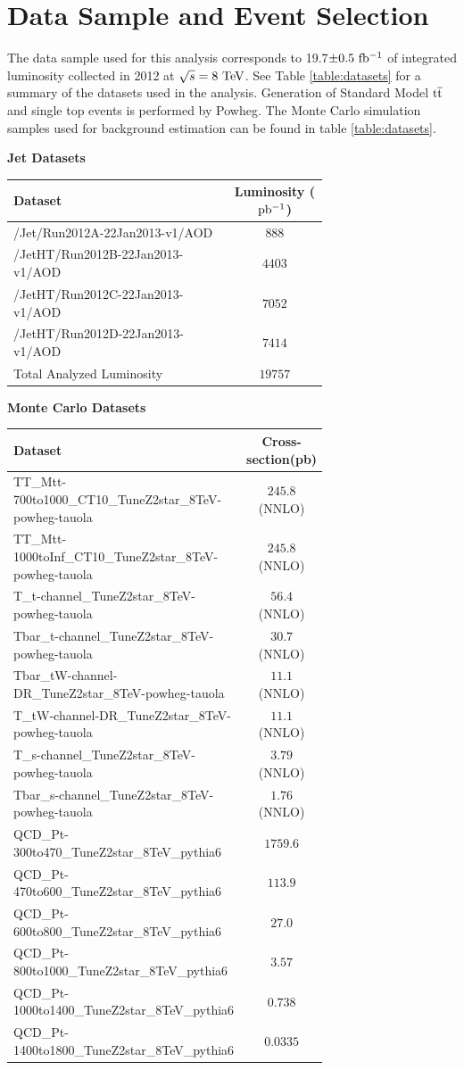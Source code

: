 \chapter{Data Sample and Event Selection}
\label{sec:datasampleAndSelection}
The data sample used for this analysis corresponds to 19.7$\pm0.5~\mathrm{fb^{-1}}$ of integrated 
luminosity collected in 2012 at $\sqrt{s} = 8~\mathrm{TeV}$.  See Table \ref{table:datasets} for a summary of the datasets used in the analysis.
Generation of Standard Model $\mathrm{t\overline{t}}$ and single top events is performed by Powheg.  The Monte Carlo simulation samples used for background estimation can be found in table \ref{table:datasets}.

\begin{table}
\begin{center}
\bf{Jet Datasets}
\begin{tabular}{|p{0.7\linewidth}|c|}
\hline
\bf{Dataset} & \bf{Luminosity ($\mathrm{pb^{-1}}$)} \\
\hline
/Jet/Run2012A-22Jan2013-v1/AOD & $888$ \\
/JetHT/Run2012B-22Jan2013-v1/AOD & $4403$ \\
/JetHT/Run2012C-22Jan2013-v1/AOD & $7052$ \\
/JetHT/Run2012D-22Jan2013-v1/AOD & $7414$ \\
\hline
Total Analyzed Luminosity & $19757$ \\
\hline
\end{tabular}
\bf{Monte Carlo Datasets} \\
\begin{tabular}{|p{0.7\linewidth}|c|}
\hline
\bf{Dataset} & \bf{Cross-section(pb)} \\
\hline
TT\_Mtt-700to1000\_CT10\_TuneZ2star\_8TeV-powheg-tauola & $245.8$ (NNLO)\\
TT\_Mtt-1000toInf\_CT10\_TuneZ2star\_8TeV-powheg-tauola & $245.8$ (NNLO)\\
T\_t-channel\_TuneZ2star\_8TeV-powheg-tauola & $56.4$ (NNLO)\\
Tbar\_t-channel\_TuneZ2star\_8TeV-powheg-tauola & $30.7$ (NNLO)\\
Tbar\_tW-channel-DR\_TuneZ2star\_8TeV-powheg-tauola & $11.1$ (NNLO)\\
T\_tW-channel-DR\_TuneZ2star\_8TeV-powheg-tauola & $11.1$ (NNLO)\\
T\_s-channel\_TuneZ2star\_8TeV-powheg-tauola & $3.79$ (NNLO)\\
Tbar\_s-channel\_TuneZ2star\_8TeV-powheg-tauola & $1.76$ (NNLO)\\
QCD\_Pt-300to470\_TuneZ2star\_8TeV\_pythia6 & $1759.6$ \\
QCD\_Pt-470to600\_TuneZ2star\_8TeV\_pythia6 & $113.9$ \\
QCD\_Pt-600to800\_TuneZ2star\_8TeV\_pythia6 & $27.0$ \\
QCD\_Pt-800to1000\_TuneZ2star\_8TeV\_pythia6 & $3.57$ \\
QCD\_Pt-1000to1400\_TuneZ2star\_8TeV\_pythia6 & $0.738$ \\
QCD\_Pt-1400to1800\_TuneZ2star\_8TeV\_pythia6 & $0.0335$ \\
\hline


\end{tabular}
\end{center}
\end{table}
